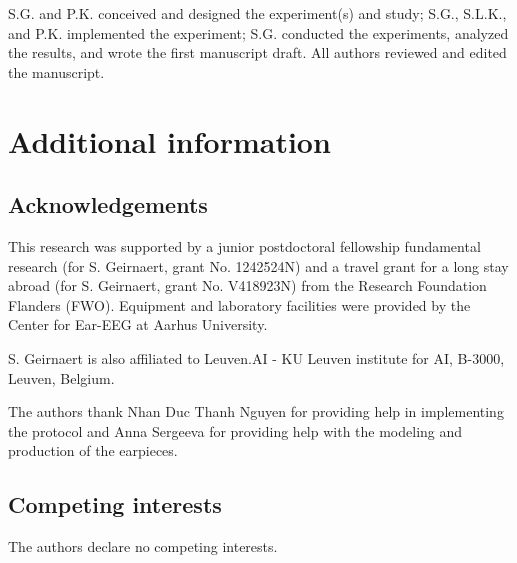 \documentclass[fleqn,10pt]{wlscirep}
\begin{document}
	S.G. and P.K. conceived and designed the experiment(s) and study; S.G., S.L.K., and P.K. implemented the experiment; S.G. conducted the experiments, analyzed the results, and wrote the first manuscript draft. All authors reviewed and edited the manuscript. 
	
	\section*{Additional information}
	\subsection*{Acknowledgements}
	
	This research was supported by a junior postdoctoral fellowship fundamental research (for S. Geirnaert, grant No. 1242524N) and a travel grant for a long stay abroad (for S. Geirnaert, grant No. V418923N) from the Research Foundation Flanders (FWO). Equipment and laboratory facilities were provided by the Center for Ear-EEG at Aarhus University.
	
	S. Geirnaert is also affiliated to Leuven.AI - KU Leuven institute for AI, B-3000, Leuven, Belgium.
	
	The authors thank Nhan Duc Thanh Nguyen for providing help in implementing the protocol and Anna Sergeeva for providing help with the modeling and production of the earpieces.
	
	\subsection*{Competing interests}
	The authors declare no competing interests.
	
	
\end{document}
